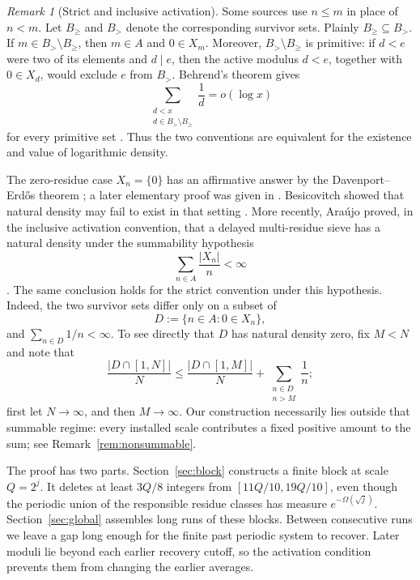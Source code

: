 \documentclass[11pt]{article}
\numberwithin{equation}{section}
\theoremstyle{definition}
\theoremstyle{remark}
\newtheorem{remark}[theorem]{Remark}
\begin{document}
\begin{remark}[Strict and inclusive activation]
Some sources use \(n\le m\) in place of \(n<m\).  Let \(B_{\ge}\) and
\(B_{>}\) denote the corresponding survivor sets.  Plainly
\(B_{\ge}\subseteq B_{>}\).  If
\(m\in B_{>}\setminus B_{\ge}\), then \(m\in A\) and \(0\in X_m\).
Moreover, \(B_{>}\setminus B_{\ge}\) is primitive: if \(d<e\) were two of
its elements and \(d\mid e\), then the active modulus \(d<e\), together
with \(0\in X_d\), would exclude \(e\) from \(B_{>}\).
Behrend's theorem gives
\[
 \sum_{\substack{d<x\\d\in B_{>}\setminus B_{\ge}}}\frac1d=o(\log x)
\]
for every primitive set \cite{Be35}.  Thus the two conventions are
equivalent for the existence and value of logarithmic density.
\end{remark}

The zero-residue case \(X_n=\{0\}\) has an affirmative answer by the
Davenport--Erd\H{o}s theorem \cite{DaEr36}; a later elementary proof was
given in \cite{DaEr51}.  Besicovitch showed that natural density may fail
to exist in that setting \cite{Be34}.  More recently, Ara\'ujo proved, in
the inclusive activation convention, that a delayed multi-residue sieve has
a natural density under the summability hypothesis
\[
 \sum_{n\in A}\frac{|X_n|}{n}<\infty
\]
\cite[Theorem~3.25]{Araujo26}.  The same conclusion holds for the strict
convention under this hypothesis.  Indeed, the two survivor sets differ
only on a subset of
\[
 D:=\{n\in A:0\in X_n\},
\]
and \(\sum_{n\in D}1/n<\infty\).  To see directly that \(D\) has natural
density zero, fix \(M<N\) and note that
\[
 \frac{|D\cap[1,N]|}{N}
 \le\frac{|D\cap[1,M]|}{N}
   +\sum_{\substack{n\in D\\n>M}}\frac1n;
\]
first let \(N\to\infty\), and then \(M\to\infty\).
Our construction necessarily lies outside that summable regime: every
installed scale contributes a fixed positive amount to the sum; see
Remark~\ref{rem:nonsummable}.

The proof has two parts.  Section~\ref{sec:block} constructs a finite block
at scale \(Q=2^j\).  It deletes at least \(3Q/8\) integers from
\([11Q/10,19Q/10]\), even though the periodic union of the responsible
residue classes has measure \(e^{-\Omega(\sqrt j)}\).
Section~\ref{sec:global} assembles long runs of these blocks.  Between
consecutive runs we leave a gap long enough for the finite past periodic
system to recover.  Later moduli lie beyond each earlier recovery cutoff,
so the activation condition prevents them from changing the earlier
averages.
\end{document}
